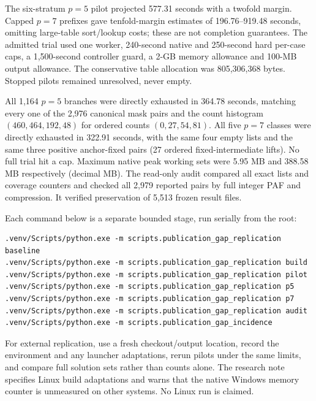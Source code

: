 \documentclass[11pt]{article}
\begin{document}
The six-stratum $p=5$ pilot projected 577.31 seconds with a twofold margin.
Capped $p=7$ prefixes gave tenfold-margin estimates of 196.76--919.48 seconds,
omitting large-table sort/lookup costs; these are not completion guarantees.
The admitted trial used one worker, 240-second native and 250-second hard
per-case caps, a 1,500-second controller guard, a 2-GB memory allowance and
100-MB output allowance. The conservative table allocation was 805,306,368
bytes. Stopped pilots remained unresolved, never empty.

All 1,164 $p=5$ branches were directly exhausted in 364.78
seconds, matching every one of the 2,976 canonical mask pairs and the count
histogram $(460,464,192,48)$ for ordered counts $(0,27,54,81)$.
All five $p=7$ classes were directly exhausted in 322.91
seconds, with the same four empty lists and the same three positive
anchor-fixed pairs (27 ordered fixed-intermediate lifts). No full trial hit
a cap. Maximum native peak working sets were
5.95 MB and
388.58 MB respectively (decimal MB).
The read-only audit compared all exact lists and coverage counters and
checked all 2,979 reported pairs by full integer PAF and compression.
It verified preservation of 5,513 frozen result files.

Each command below is a separate bounded stage, run serially from the root:
\begin{verbatim}
.venv/Scripts/python.exe -m scripts.publication_gap_replication baseline
.venv/Scripts/python.exe -m scripts.publication_gap_replication build
.venv/Scripts/python.exe -m scripts.publication_gap_replication pilot
.venv/Scripts/python.exe -m scripts.publication_gap_replication p5
.venv/Scripts/python.exe -m scripts.publication_gap_replication p7
.venv/Scripts/python.exe -m scripts.publication_gap_replication audit
.venv/Scripts/python.exe -m scripts.publication_gap_incidence
\end{verbatim}
For external replication, use a fresh checkout/output location, record the
environment and any launcher adaptations, rerun pilots under the same limits,
and compare full solution sets rather than counts alone. The research note
specifies Linux build adaptations and warns that the native Windows memory
counter is unmeasured on other systems. No Linux run is claimed.
\end{document}
